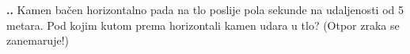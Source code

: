 
\noindent 
\textbf{
\thecjelina.\thezadatak.}
Kamen bačen horizontalno pada na tlo poslije pola sekunde na udaljenosti od 5 metara. Pod kojim kutom prema horizontali kamen udara u tlo? (Otpor zraka se zanemaruje!)


